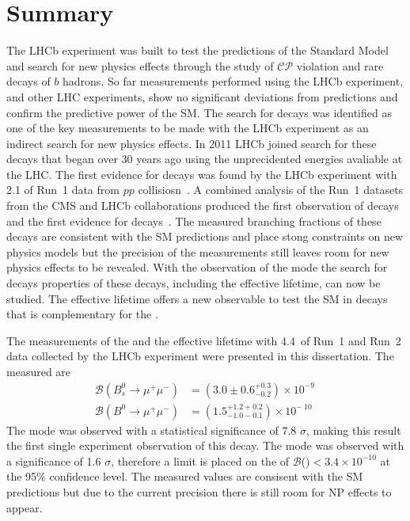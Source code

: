 \section{Summary}
The LHCb experiment was built to test the predictions of the Standard Model and search for new physics effects through the study of $\mathcal{CP}$ violation and rare decays of $b$ hadrons. So far measurements performed using the LHCb experiment, and other LHC experiments, show no significant deviations from predictions and confirm the predictive power of the SM. 
The search for \bmumu decays was identified as one of the key measurements to be made with the LHCb experiment\cite{Adeva:2009ny} as an indirect search for new physics effects.
In 2011 LHCb joined search for these decays that began over 30 years ago using the unprecidented energies avaliable at the LHC. The first evidence for \bsmumu decays was found by the LHCb experiment with 2.1 \fb of Run~1 data from $pp$ collisiosn~\cite{Aaji:2012nna}.  A combined analysis of the Run~1 datasets from the CMS and LHCb collaborations produced the first observation of \bsmumu decays and the first evidence for \bdmumu decays~\cite{CMS:2014xfa}. The measured branching fractions of these decays are consistent with the SM predictions and place stong constraints on new physics models but the precision of the measurements still leaves room for new physics effects to be revealed. With the observation of the \bs mode the search for \bsmumu decays properties of these decays, including the effective lifetime, can now be studied. The effective lifetime offers a new observable to test the SM in \bsmumu decays that is complementary for the \BF. 

The measurements of the \bmumu \BF and the \bsmumu effective lifetime with 4.4~\fb of Run~1 and Run~2 data collected by the LHCb experiment were presented in this dissertation. The measured \BFs are
\begin{equation}
\begin{split}
  \mathcal{B}(B^{0}_{s} \to \mu^{+} \mu^{-}) &= (3.0 \pm 0.6^{+0.3}_{-0.2}) \times 10^{-9\
} \\
  \mathcal{B}(B^{0} \to \mu^{+} \mu^{-}) &= (1.5^{+1.2 +0.2}_{-1.0 -0.1})    \times 10^{-\
10}
\end{split}
\label{eq:BFresults2}
\end{equation}
The \bs mode was observed with a statistical significance of 7.8 $\sigma$, making this result the first single experiment observation of this decay. The \bd mode was observed with a significance of 1.6 $\sigma$, therefore a limit is placed on the \BF of $\mathcal{B}$(\bdmumu)$ < 3.4 \times 10^{-10}$ at the 95$\%$ confidence level. The measured values are consisent with the SM predictions but due to the current precision there is still room for NP effects to appear. %



